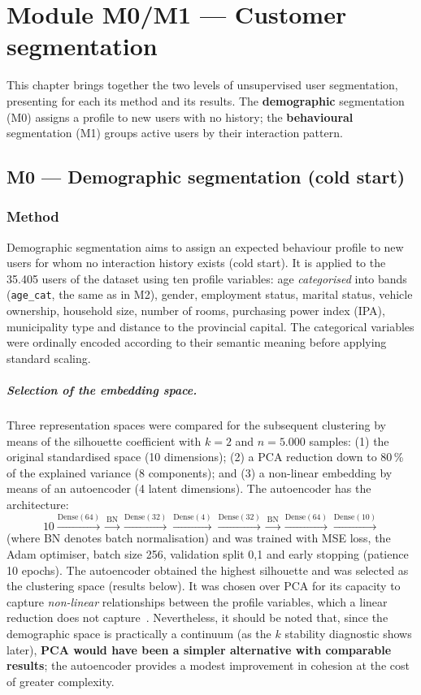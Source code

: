 \chapter{Module M0/M1 — Customer segmentation}
\label{cap:segmentacion}

This chapter brings together the two levels of unsupervised user segmentation, presenting for each its method and its results. The \textbf{demographic} segmentation (M0) assigns a profile to new users with no history; the \textbf{behavioural} segmentation (M1) groups active users by their interaction pattern.

\section{M0 — Demographic segmentation (cold start)}

\subsection{Method}

Demographic segmentation aims to assign an expected behaviour profile to new users for whom no interaction history exists (cold start). It is applied to the 35.405 users of the dataset using ten profile variables: age \emph{categorised} into bands (\texttt{age\_cat}, the same as in M2), gender, employment status, marital status, vehicle ownership, household size, number of rooms, purchasing power index (IPA), municipality type and distance to the provincial capital. The categorical variables were ordinally encoded according to their semantic meaning before applying standard scaling.

\paragraph{Selection of the embedding space.} Three representation spaces were compared for the subsequent clustering by means of the silhouette coefficient with $k=2$ and $n=5.000$ samples: (1) the original standardised space (10 dimensions); (2) a PCA reduction down to 80\,\% of the explained variance (8 components); and (3) a non-linear embedding by means of an autoencoder (4 latent dimensions). The autoencoder has the architecture:
\[
10 \xrightarrow{\text{Dense}(64)} \xrightarrow{\text{BN}} \xrightarrow{\text{Dense}(32)} \xrightarrow{\text{Dense}(4)} \xrightarrow{\text{Dense}(32)} \xrightarrow{\text{BN}} \xrightarrow{\text{Dense}(64)} \xrightarrow{\text{Dense}(10)}
\]
(where BN denotes batch normalisation) and was trained with MSE loss, the Adam optimiser, batch size 256, validation split 0,1 and early stopping (patience 10 epochs). The autoencoder obtained the highest silhouette and was selected as the clustering space (results below). It was chosen over PCA for its capacity to capture \emph{non-linear} relationships between the profile variables, which a linear reduction does not capture~\cite{hinton2006}. Nevertheless, it should be noted that, since the demographic space is practically a continuum (as the $k$ stability diagnostic shows later), \textbf{PCA would have been a simpler alternative with comparable results}; the autoencoder provides a modest improvement in cohesion at the cost of greater complexity.

